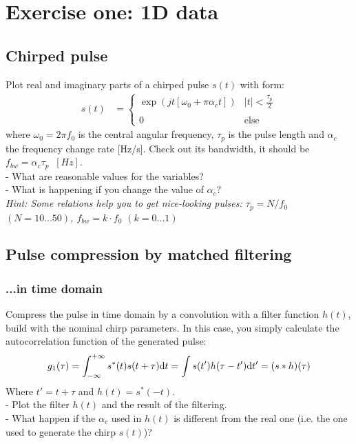 
%

\section{Exercise one: 1D data}
\subsection{Chirped pulse}

Plot real and imaginary parts of a chirped pulse $s(t)$ with form:
\begin{align}
  s(t) &= \left\{\begin{array}{ll}
       \exp\left(j t\left[\omega_0 + \pi\alpha_c t\right]\right)&|t| < \frac{\tau_p}{2}\\
       \\
       0 & \text{else}
       \end{array}\right.
\end{align}
where $\omega_0 = 2\pi f_0$ is the central angular frequency, $\tau_p$ is the pulse length and $\alpha_c$ the frequency change rate [Hz/s]. Check out its bandwidth, it should be $f_{bw} = \alpha_c \tau_p \; \;[Hz]$.\\
 - What are reasonable values for the variables?\\
 - What is happening if you change the value of $\alpha_c$?\\
 \textit{Hint: Some relations help you to get nice-looking pulses: $\tau_p = N/f_0$ $(N = 10...50)$, $f_{bw} = k\cdot f_0$ $(k = 0...1)$}
 

\subsection{Pulse compression by matched filtering}
\subsubsection{...in time domain}

Compress the pulse in time domain by a convolution with a filter function $h(t)$, build with the nominal chirp parameters. In this case, you simply calculate the autocorrelation function of the generated pulse:
\begin{align}
g_1(\tau) = \int_{-\infty}^{+\infty}s^*(t)s(t+\tau)\text{d} t = \int s(t')h(\tau-t') \text{d} t' = (s*h)(\tau)
\end{align}
Where $t' = t+\tau$ and $h(t) = s^*(-t)$.\\
 - Plot the filter $h(t)$ and the result of the filtering. \\
 - What happen if the $\alpha_c$ used in $h(t)$ is different from the real one (i.e. the one used to generate the chirp $s(t)$)?\\

